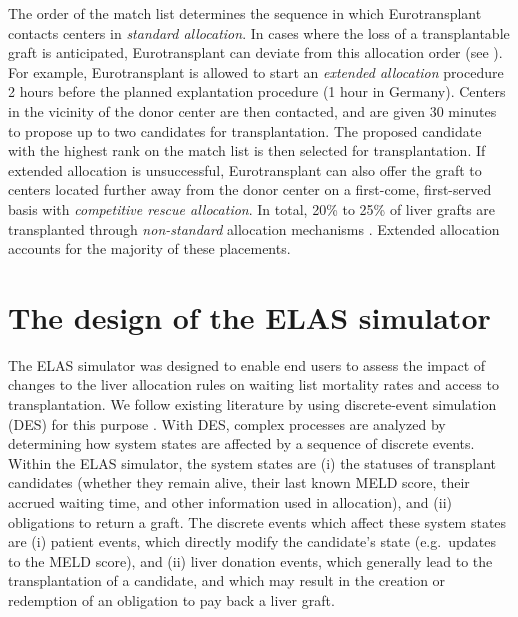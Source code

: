 \documentclass[11pt,twoside,]{book}
\begin{document}
The order of the match list determines the sequence in which Eurotransplant contacts
centers in \emph{standard allocation}. In cases where the loss of a transplantable graft
is anticipated, Eurotransplant can deviate from this allocation order (see
\citep{jochmansAdultLiverAllocation2017, ETLiverMan2025}). For example, Eurotransplant
is allowed to start an \emph{extended allocation} procedure 2 hours before the planned
explantation procedure (1 hour in Germany). Centers in the vicinity of the donor
center are then contacted, and are given 30 minutes to propose up to two
candidates for transplantation. The proposed candidate with the highest rank
on the match list is then selected for transplantation. If extended allocation is unsuccessful, Eurotransplant can also offer
the graft to centers located further away from the donor center on a first-come, first-served basis
with \emph{competitive rescue allocation}. In
total, 20\% to 25\% of liver grafts are transplanted through \emph{non-standard} allocation
mechanisms \citep{jochmansAdultLiverAllocation2017}. Extended allocation accounts for the majority of these placements.
\vfill
\newpage

\section{The design of the ELAS simulator}\label{sec:elasdesign}

The ELAS simulator was designed to enable end users to assess the impact of changes
to the liver allocation rules on waiting list mortality rates and access to
transplantation. We follow existing literature
by using discrete-event simulation (DES) for this purpose \citep{shechterClinicallyBasedDiscreteEvent2005, Pritsker1995, ratcliffeSimulationModellingApproach2001, ThompsonXSAM2004}. With DES,
complex processes are analyzed by determining how system states are
affected by a sequence of discrete events. Within the ELAS simulator,
the system states are (i) the statuses of transplant candidates
(whether they remain alive, their last known MELD score, their accrued
waiting time, and other information used in allocation), and (ii)
obligations to return a graft. The discrete events which affect these
system states are (i) patient events, which directly modify the
candidate's state (e.g.~updates to the MELD score), and (ii) liver donation
events, which generally lead to the transplantation
of a candidate, and which may result in the creation or redemption of an
obligation to pay back a liver graft.
\end{document}
